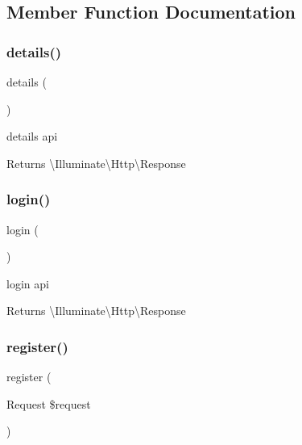 \subsection{Member Function Documentation}
\mbox{\label{class_app_1_1_http_1_1_controllers_1_1_a_p_i_1_1_user_controller_aa0c43d17f37908e525a61168ae0c5b26}} 
\subsubsection{\texorpdfstring{details()}{details()}}
{\footnotesize\ttfamily details (\begin{DoxyParamCaption}{ }\end{DoxyParamCaption})}

details api

\begin{DoxyReturn}{Returns}
\textbackslash{}\+Illuminate\textbackslash{}\+Http\textbackslash{}\+Response 
\end{DoxyReturn}
\mbox{\label{class_app_1_1_http_1_1_controllers_1_1_a_p_i_1_1_user_controller_aa311da27ba5706f5710cea7706c8eae1}} 
\subsubsection{\texorpdfstring{login()}{login()}}
{\footnotesize\ttfamily login (\begin{DoxyParamCaption}{ }\end{DoxyParamCaption})}

login api

\begin{DoxyReturn}{Returns}
\textbackslash{}\+Illuminate\textbackslash{}\+Http\textbackslash{}\+Response 
\end{DoxyReturn}
\mbox{\label{class_app_1_1_http_1_1_controllers_1_1_a_p_i_1_1_user_controller_ad354167fc268b59819f72a28e6be0987}} 
\subsubsection{\texorpdfstring{register()}{register()}}
{\footnotesize\ttfamily register (\begin{DoxyParamCaption}\item[{Request}]{\$request }\end{DoxyParamCaption})}

